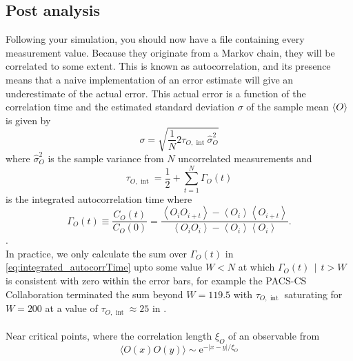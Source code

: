 \documentclass[a4paper,10pt]{book}
\begin{document}
\subsection{Post analysis}\label{sec:PostAnalysis}
Following your simulation, you should now have a file containing every measurement value. Because they originate from a Markov chain, they will be correlated to some extent. This is known as autocorrelation, and its presence means that a naive implementation of an error estimate will give an underestimate of the actual error. This actual error is a function of the correlation time and the estimated standard deviation  $\sigma$ of the sample mean $\braket{O}$ is given by
\begin{equation}
\sigma=\sqrt{\frac{1}{N} 2 \tau_{O, \text { int }} \widehat{\sigma}_{O}^{2}}
\end{equation}
where $\widehat{\sigma}_{O}^{2}$ is the sample variance from $N$ uncorrelated measurements and 
\begin{equation}\label{eq:integrated_autocorrTime}
\tau_{O, \text { int }} = \frac{1}{2}+\sum_{t=1}^{N} \Gamma_{O}(t)
\end{equation}
is the integrated autocorrelation time where 
\begin{equation}
\Gamma_{O}(t) \equiv \frac{C_{O}(t)}{C_{O}(0)} = \frac{\left\langle O_{i} O_{i+t}\right\rangle-\left\langle O_{i}\right\rangle\left\langle O_{i+t}\right\rangle}{\left\langle O_{i} O_{i}\right\rangle-\left\langle O_{i}\right\rangle\left\langle O_{i}\right\rangle}.
\end{equation}
\cite{L_scher_2003}.\\
In practice, we only calculate the sum over $\Gamma_{O}(t)$ in \eqref{eq:integrated_autocorrTime} upto some value $W < N$ at which $\Gamma_{O}(t)\,\mid\,t>W$ is consistent with zero within the error bars, for example the PACS-CS Collaboration terminated the sum beyond $W=119.5$ with $\tau_{O, \text { int }}$ saturating for $W=200$ at a value of $\tau_{O, \text { int }}\approx 25$ in \cite{Aoki_2009}.\\\\Near critical points, where the correlation length $\xi_{O}$ of an observable from
\begin{equation}
\langle O(x) O(y)\rangle \sim \mathrm{e}^{-|x-y| / \xi_{O}}
\end{equation}
\end{document}
